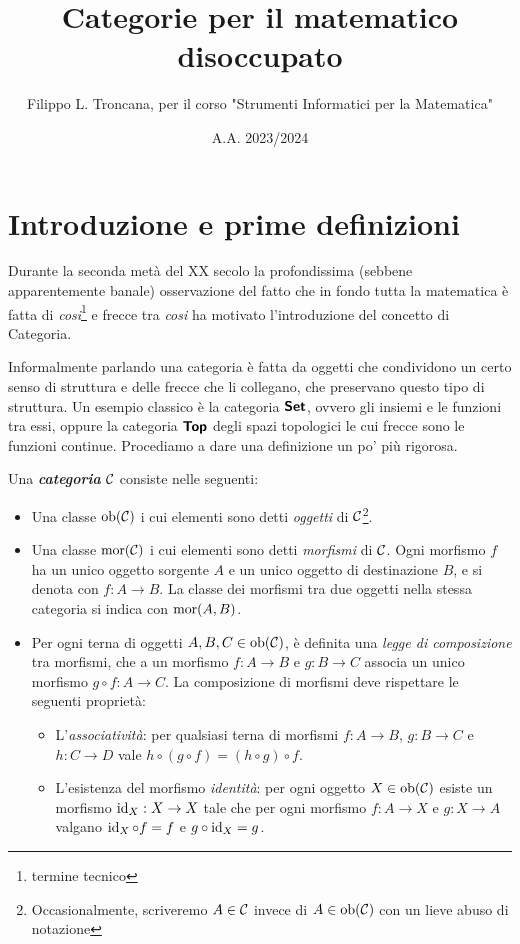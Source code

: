 \documentclass{article}
\title{Categorie per il matematico disoccupato}
\author{Filippo L. Troncana, per il corso "Strumenti Informatici per la Matematica"}
\date{A.A. 2023/2024}
\begin{document}
\maketitle

\section{Introduzione e prime definizioni}
\label{sec:Intro}

Durante la seconda metà del XX secolo la profondissima (sebbene apparentemente banale) osservazione del fatto che in fondo tutta la matematica è fatta di \textit{cosi}\footnote{termine tecnico} e frecce tra \textit{cosi} ha motivato l'introduzione del concetto di Categoria.

Informalmente parlando una categoria è fatta da oggetti che condividono un certo senso di struttura e delle frecce che li collegano, che preservano questo tipo di struttura. Un esempio classico è la categoria $\text{\sffamily\textbf{Set}}$, ovvero gli insiemi e le funzioni tra essi, oppure la categoria $\text{\sffamily\textbf{Top}}$ degli spazi topologici le cui frecce sono le funzioni continue. Procediamo a dare una definizione un po' più rigorosa.

\begin{definition}
    Una \emph{\textbf{categoria}} $\mathcal{C}$ consiste nelle seguenti:
    \begin{itemize}
        \item Una classe $\operatorname{ob}(\mathcal{C})$ i cui elementi sono detti \emph{oggetti} di $\mathcal{C}$\footnote{Occasionalmente, scriveremo $A\in \mathcal{C}$ invece di $A \in \operatorname{ob}(\mathcal{C})$ con un lieve abuso di notazione}.
        \item Una classe $\operatorname{mor}(\mathcal{C})$ i cui elementi sono detti \emph{morfismi} di $\mathcal{C}$. Ogni morfismo $f$ ha un unico oggetto sorgente $A$ e un unico oggetto di destinazione $B$, e si denota con $f:A\to B$. La classe dei morfismi tra due oggetti nella stessa categoria si indica con $\operatorname{mor}(A,B)$.
        \item Per ogni terna di oggetti $A,B,C \in \operatorname{ob}(\mathcal{C})$, è definita una \emph{legge di composizione} tra morfismi, che a un morfismo $f : A \to B$ e $g: B \to C$ associa un unico morfismo $g \circ f : A \to C$. La composizione di morfismi deve rispettare le seguenti proprietà:
        \begin{itemize}
            \item L'\emph{associatività}: per qualsiasi terna di morfismi $f: A\to B$, $g: B\to C$ e $h:C \to D$ vale $h \circ (g \circ f) = (h \circ g) \circ f$.
            \item L'esistenza del morfismo \emph{identità}: per ogni oggetto $X \in \operatorname{ob}(\mathcal{C})$ esiste un morfismo $\operatorname{id}_{X} : X \to X$ tale che per ogni morfismo $f:A \to X$ e $g: X \to A$ valgano $\operatorname{id}_{X} \circ f = f$ e $g \circ \operatorname{id}_{X} = g$.
        \end{itemize}
    \end{itemize}
\end{definition}
\end{document}

